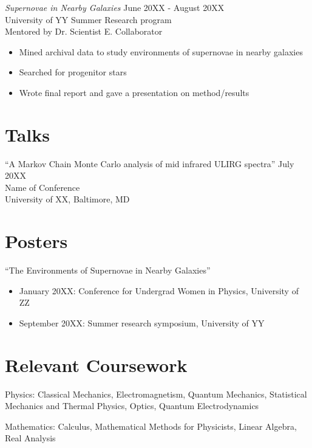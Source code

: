 \documentclass[resmargin, 10pt]{res} %
\begin{document}
\begin{resume}
	{\sl Supernovae in Nearby Galaxies} \hfill June 20XX - August 20XX \\
	University of YY Summer Research program \\
	Mentored by Dr. Scientist E. Collaborator
	\vspace{1mm}
	\begin{itemize}\itemsep -2pt
		\item Mined archival data to study environments of supernovae in nearby galaxies
		\item Searched for progenitor stars
		\item Wrote final report and gave a presentation on method/results
	\end{itemize}


	\section{Talks}
	``A Markov Chain Monte Carlo analysis of mid infrared ULIRG spectra'' \hfill July 20XX \\
	Name of Conference\\
	University of XX, Baltimore, MD


	\section{Posters}
	``The Environments of Supernovae in Nearby Galaxies''
	\vspace{0.5em}
	\begin{itemize} \itemsep -2pt
		\item January 20XX: Conference for Undergrad Women in Physics, University of ZZ
		\item September 20XX: Summer research symposium, University of YY
	\end{itemize}


	\section{Relevant Coursework}
	Physics: Classical Mechanics, Electromagnetism, Quantum Mechanics, Statistical Mechanics and Thermal Physics, Optics, Quantum Electrodynamics

	Mathematics: Calculus, Mathematical Methods for Physicists, Linear Algebra, Real Analysis


\end{resume}
\end{document}
